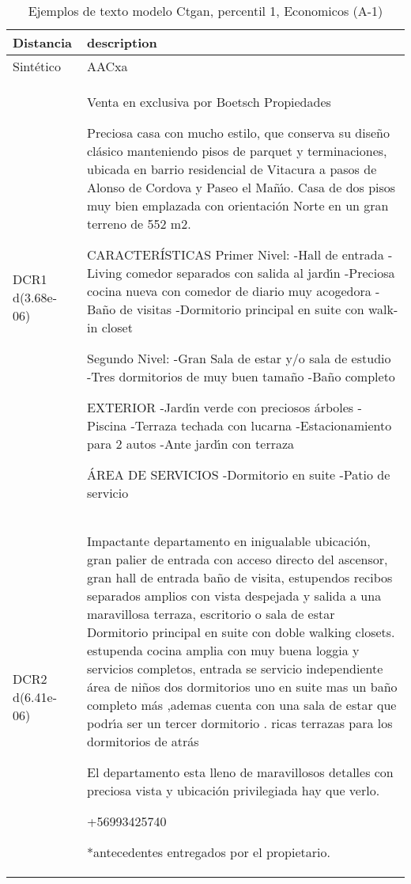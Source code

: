 \begin{table}[H]
\centering
\fontsize{10}{14}\selectfont
\caption{Ejemplos de texto modelo Ctgan, percentil 1, Economicos (A-1)}
\label{table-example-economicos-a-1-ctgan-1p-text}
\begin{tabular}{|l|m{35em}|}
\hline
\rowcolor[gray]{0.8}
Distancia & description \\
\hline Sintético & AACxa \\
\hline DCR1 d(3.68e-06) & Venta en exclusiva por Boetsch Propiedades

Preciosa casa con mucho estilo, que conserva su dise\~no cl\'asico manteniendo pisos de parquet y terminaciones, ubicada en barrio residencial de Vitacura a pasos de Alonso de Cordova y Paseo el Ma\~n{\'\i}o. Casa de dos pisos muy bien emplazada con orientaci\'on Norte en un gran terreno de 552 m2. 

CARACTER\'ISTICAS
Primer Nivel:
-Hall de entrada 
-Living comedor separados con salida al jard{\'\i}n 
-Preciosa cocina nueva con comedor de diario muy acogedora
-Ba\~no de visitas
-Dormitorio principal en suite con walk-in closet

Segundo Nivel:
-Gran Sala de estar y/o sala de estudio
-Tres dormitorios de muy buen tama\~no
-Ba\~no completo

EXTERIOR
-Jard{\'\i}n verde con preciosos \'arboles
-Piscina 
-Terraza techada con lucarna
-Estacionamiento para 2 autos
-Ante jard{\'\i}n con terraza

\'AREA DE SERVICIOS
-Dormitorio en suite
-Patio de servicio \\
\hline DCR2 d(6.41e-06) & Impactante departamento en inigualable ubicaci\'on,  gran palier de entrada con acceso directo del ascensor, gran hall de entrada ba\~no de visita, estupendos recibos separados  amplios con vista despejada y salida a una maravillosa terraza, escritorio  o sala de estar
Dormitorio principal en suite con doble walking closets.
estupenda cocina amplia con muy buena loggia y servicios completos,  entrada se servicio independiente
\'area de ni\~nos dos dormitorios uno en suite mas un ba\~no completo m\'as ,ademas cuenta  con una sala de estar que podr{\'\i}a ser un tercer dormitorio . 
ricas terrazas para los dormitorios de atr\'as 
 
El departamento esta lleno de maravillosos detalles con preciosa vista y ubicaci\'on privilegiada 
hay que verlo.


+56993425740

*antecedentes entregados por el propietario. \\
\hline
\end{tabular}
\end{table}
